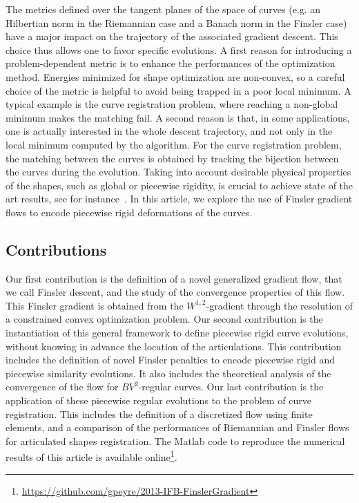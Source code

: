 The metrics defined over the tangent planes of the space of curves (e.g. an Hilbertian norm in the Riemannian case and a Banach norm in the Finsler case) have a major impact on the trajectory of the associated gradient descent. This choice thus allows one to favor specific evolutions. A first reason for introducing a problem-dependent metric is to enhance the performances of the optimization method. Energies minimized for shape optimization are non-convex, so a careful choice of the metric is helpful to avoid being trapped in a poor local minimum. A typical example is the curve registration problem, where reaching a non-global minimum makes the matching fail. A second reason is that, in some applications, one is actually interested in the whole descent trajectory, and not only in the local minimum computed by the algorithm. For the curve registration problem, the matching between the curves is obtained by tracking the bijection between the curves during the evolution. Taking into account desirable physical properties of the shapes, such as global or piecewise rigidity, is crucial to achieve state of the art results, see for instance~\cite{citeulike,chang08articulated,Shelton-2000}. In this article, we explore the use of Finsler gradient flows to encode piecewise rigid deformations of the curves. 



\subsection{Contributions} 

Our first contribution is the definition of a novel generalized gradient flow, that we call Finsler descent, and the study of the convergence properties of this flow. This Finsler gradient is obtained from the $W^{1,2}$-gradient through the resolution of a constrained convex optimization problem. Our second contribution is the instantiation of this general framework to define piecewise rigid curve evolutions, without knowing in advance the location of the articulations. This contribution includes the definition of novel Finsler penalties to encode piecewise rigid and piecewise similarity evolutions. It also includes the theoretical analysis of the convergence of the flow for $BV^2$-regular curves. Our last contribution is the application of these piecewise regular evolutions to the problem of curve registration. This includes the definition of a discretized flow using finite elements, and a comparison of the performances of Riemannian and Finsler flows for articulated shapes registration.  The Matlab code to reproduce the numerical results of this article is available online\footnote{\url{https://github.com/gpeyre/2013-IFB-FinslerGradient}}.


